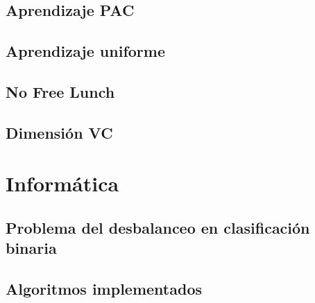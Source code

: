 \documentclass[a4paper,11pt]{report}
\begin{document}
  \chapter{Aprendizaje PAC}
    
  \chapter{Aprendizaje uniforme}
    
  \chapter{No Free Lunch}
    
  \chapter{Dimensión VC}
    
  
\part{Informática}
  \chapter{Problema del desbalanceo en clasificación binaria}
    
  \chapter{Algoritmos implementados}
    
    
    
    


% 
%

\end{document}
